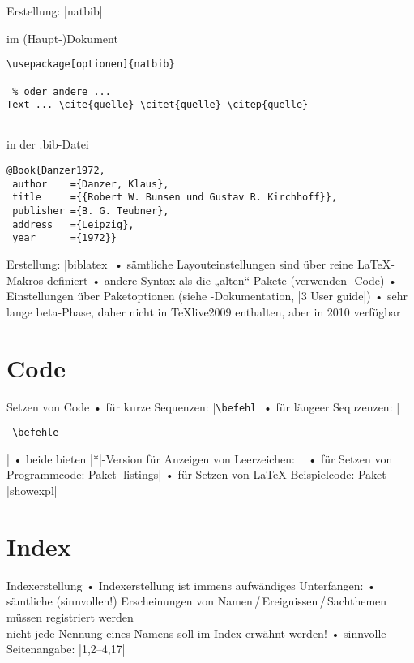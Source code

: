 \begin{frame}[fragile]{Erstellung: |natbib|}
\begin{block}{im (Haupt-)Dokument}
\begin{verbatim}
\usepackage[optionen]{natbib}

 % oder andere ...
Text ... \cite{quelle} \citet{quelle} \citep{quelle}


\end{verbatim}
\end{block}

\begin{block}{in der .bib-Datei}
\begin{verbatim}
@Book{Danzer1972,
 author    ={Danzer, Klaus},
 title     ={{Robert W. Bunsen und Gustav R. Kirchhoff}},
 publisher ={B. G. Teubner},
 address   ={Leipzig},
 year      ={1972}}
\end{verbatim}
\end{block}
\end{frame}

\begin{frame}[fragile]{Erstellung: |biblatex|}
• sämtliche Layouteinstellungen sind über reine \LaTeX-Makros definiert
• andere Syntax als die „alten“ Pakete (verwenden \BibTeX-Code)
• Einstellungen über Paketoptionen (siehe -Dokumentation, |3 User guide|)
• sehr lange beta-Phase, daher nicht in \TeX live2009 enthalten, aber in 2010 verfügbar
\• 
\end{frame}

\section{Code}
\begin{frame}[fragile]{Setzen von Code}
• für kurze Sequenzen: |\verb~\befehl~|
• für längeer Sequzenzen: |\begin{verbatim} \befehle \end{verbatim}|
• beide bieten |*|-Version für Anzeigen von Leerzeichen: \verb$ $
• für Setzen von Programmcode: Paket |listings|
• für Setzen von \LaTeX-Beispielcode: Paket |showexpl|
\•
\end{frame}

\section{Index}
\begin{frame}[fragile]{Indexerstellung}
• Indexerstellung ist immens aufwändiges Unterfangen:
• sämtliche (sinnvollen!) Erscheinungen von Namen\,/\,Ereignissen\,/\,Sachthemen müssen registriert werden\\%
nicht jede Nennung eines Namens soll im Index erwähnt werden!
• sinnvolle Seitenangabe: |1,2–4,17|
\• 
\end{frame}

